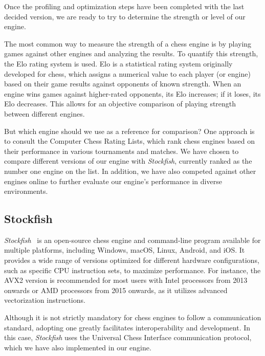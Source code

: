 Once the profiling and optimization steps have been completed with the last decided version, we are ready to try to determine the strength or level of our engine.

\vspace{1em}

\noindent The most common way to measure the strength of a chess engine is by playing games against other engines and analyzing the results. To quantify this strength, the Elo rating system is used. Elo is a statistical rating system originally developed for chess, which assigns a numerical value to each player (or engine) based on their game results against opponents of known strength. When an engine wins games against higher-rated opponents, its Elo increases; if it loses, its Elo decreases. This allows for an objective comparison of playing strength between different engines.

\vspace{1em}

\noindent But which engine should we use as a reference for comparison? One approach is to consult the Computer Chess Rating Lists, which rank chess engines based on their performance in various tournaments and matches. We have chosen to compare different versions of our engine with \textit{Stockfish}, currently ranked as the number one engine on the list. In addition, we have also competed against other engines online to further evaluate our engine's performance in diverse environments.

\subsection{Stockfish}

\textit{Stockfish}~\cite{Stockfish} is an open-source chess engine and command-line program available for multiple platforms, including Windows, macOS, Linux, Android, and iOS. It provides a wide range of versions optimized for different hardware configurations, such as specific CPU instruction sets, to maximize performance. For instance, the AVX2 version is recommended for most users with Intel processors from 2013 onwards or AMD processors from 2015 onwards, as it utilizes advanced vectorization instructions.

\vspace{1em}

\noindent Although it is not strictly mandatory for chess engines to follow a communication standard, adopting one greatly facilitates interoperability and development. In this case, \textit{Stockfish} uses the Universal Chess Interface communication protocol, which we have also implemented in our engine.


